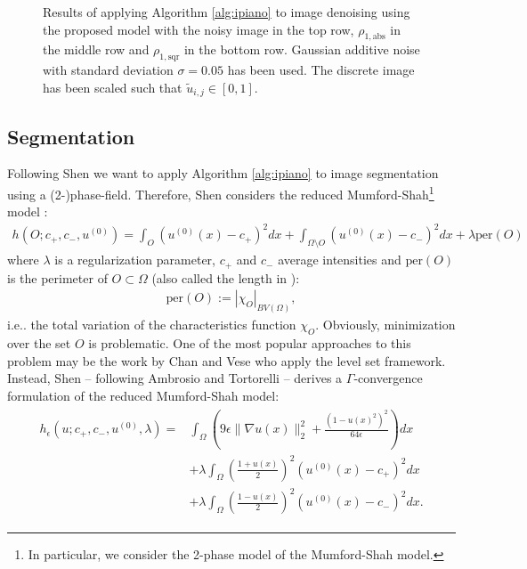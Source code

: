 \documentclass[onecolumn,final,a4paper,13pt,reqno]{siamart}
\makeatletter
\DeclareRobustCommand\onedot{\futurelet\@let@token\@onedot}
\def\@onedot{\ifx\@let@token.\else.\null\fi\xspace}
\def\ie{{i.e}\onedot} \def\Ie{{I.e}\onedot}
\def\per{\text{per}}
\makeatother
\begin{document}
\begin{figure}[h]
\begin{subfigure}[t]{0.19\textwidth}
	\end{subfigure}
	\caption{Results of applying Algorithm \ref{alg:ipiano} to image denoising using the proposed model with the noisy image in the top row, $\rho_{1,\text{abs}}$ in the middle row and $\rho_{1,\text{sqr}}$ in the bottom row. Gaussian additive noise with standard deviation $\sigma = 0.05$ has been used. The discrete image has been scaled such that $\tilde{u}_{i,j} \in [0,1]$.}
	\label{fig:image-denoising}
\end{figure}

\subsection{Segmentation}

Following Shen \cite{Shen:2005} we want to apply Algorithm \ref{alg:ipiano} to image segmentation using a (2-)phase-field. Therefore, Shen considers the reduced Mumford-Shah\footnote{
	In particular, we consider the 2-phase model of the Mumford-Shah model.
} model \cite{MumfordShah:1989}:
\begin{align}
	h(O; c_+, c_-, u^{(0)}) = \int_{O} (u^{(0)}(x) - c_+)^2 dx + \int_{\Omega\setminus O} (u^{(0)}(x) - c_-)^2 dx + \lambda \per(O)
\end{align}
where $\lambda$ is a regularization parameter, $c_+$ and $c_-$ average intensities and $\per(O)$ is the perimeter of $O \subset \Omega$ (also called the length in \cite{Shen:2005}):
\begin{align}
	\per(O) := |\chi_O|_{BV(\Omega)},
\end{align}
\ie the total variation of the characteristics function $\chi_O$. Obviously, minimization over the set $O$ is problematic. One of the most popular approaches to this problem may be the work by Chan and Vese \cite{ChanVese:2002} who apply the level set framework. Instead, Shen -- following Ambrosio and Tortorelli \cite{AmbrosioTortorelli:1990} -- derives a $\Gamma$-convergence formulation of the reduced Mumford-Shah model:
\begin{align}
	\begin{aligned}
		h_\epsilon(u; c_+, c_-, u^{(0)}, \lambda) =& \int_{\Omega} \left(9 \epsilon \|\nabla u(x)\|_2^2 + \frac{(1 - u(x)^2)^2}{64 \epsilon}\right) dx\\
		& + \lambda \int_{\Omega}\left(\frac{1 + u(x)}{2}\right)^2(u^{(0)}(x) - c_+)^2 dx\\
		& + \lambda \int_{\Omega} \left(\frac{1 - u(x)}{2}\right)^2 (u^{(0)}(x) - c_-)^2 dx.
	\end{aligned}\label{eq:phase-field-h}
\end{align}
\end{document}

